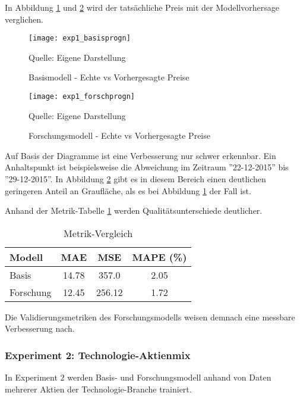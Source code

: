 In Abbildung \ref{fig:exp1_basisprogn} und \ref{fig:exp1_forschprogn} wird der tatsächliche Preis mit der Modellvorhersage verglichen.
\begin{figure}[H]
	\caption{Basismodell - Echte vs Vorhergesagte Preise}
	\texttt{[image: exp1\_basisprogn]}
	\label{fig:exp1_basisprogn}
	\raggedright
	\normalsize{Quelle: Eigene Darstellung}
	\vspace{-1.0em}
\end{figure}
\begin{figure}[H]
	\caption{Forschungsmodell - Echte vs Vorhergesagte Preise}
	\texttt{[image: exp1\_forschprogn]}
	\label{fig:exp1_forschprogn}
	\raggedright
	\normalsize{Quelle: Eigene Darstellung}
	\vspace{-1.0em}
\end{figure}
Auf Basis der Diagramme ist eine Verbesserung nur schwer erkennbar. Ein Anhaltspunkt ist beispielsweise die Abweichung im Zeitraum ''22-12-2015'' bis ''29-12-2015''. In Abbildung \ref{fig:exp1_forschprogn} gibt es in diesem Bereich einen deutlichen geringeren Anteil an Graufläche, als es bei Abbildung \ref{fig:exp1_basisprogn} der Fall ist.

Anhand der Metrik-Tabelle \ref{tbl:exp1_model_metrics} werden Qualitätsunterschiede deutlicher.
\begin{table}[H]
	\centering
	\caption{Metrik-Vergleich}
	\label{tbl:exp1_model_metrics}
	\begin{tabular}{lccc}
		\hline
		\textbf{Modell} & \textbf{MAE} & \textbf{MSE} & \textbf{MAPE (\%)} \\
		\hline
		Basis & 14.78 & 357.0 & 2.05 \\
		Forschung & 12.45 & 256.12 & 1.72 \\
		\hline
	\end{tabular}
\end{table}
Die Validierungsmetriken des Forschungsmodells weisen demnach eine messbare Verbesserung nach.

\subsubsection{Experiment 2: Technologie-Aktienmix}\label{sec:evaluierung_exp2}
In Experiment $2$ werden Basis- und Forschungsmodell anhand von Daten mehrerer Aktien der Technologie-Branche trainiert.


